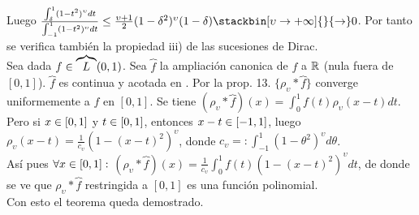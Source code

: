 Luego $\frac{\int_\delta^1 (1-t^2)^\upsilon dt}{\int_{-1}^1 (1-t^2)^\upsilon dt} \leq \frac{\upsilon +1}{2} (1-\delta^2)^\upsilon (1-\delta) \stackbin[\upsilon \to +\infty]{}{\flecha} 0$. Por tanto se verifica también la propiedad iii) de las sucesiones de Dirac. \\
Sea dada $f \in \overbrace{L}(0,1)$. Sea $\overbrace{f}$ la ampliación canonica de $f$ a $\mathbb{R}$ (nula fuera de $[0,1]$). $\overbrace{f}$ es continua y acotada en \R . Por la prop. 13. $\lbrace \rho_\upsilon * \overbrace{f} \rbrace$ converge uniformemente a $f$ en $[0,1]$. Se tiene $(\rho_\upsilon * \overbrace{f} )(x)=\int_0^1 f(t)\rho_\upsilon (x-t)dt$. Pero si $x \in [0,1]$ y $t\in [0,1]$, entonces $x-t \in [-1,1]$, luego $\rho_\upsilon (x-t)=\frac{1}{c_\upsilon}(1-(x-t)^2)^\upsilon$, donde $c_\upsilon =:\int_{-1}^1 (1-\theta^2)^\upsilon d\theta$. \\
Así pues $\forall x \in [0,1]:$ $(\rho_\upsilon * \overbrace{f})(x)=\frac{1}{c_\upsilon}\int_0^1 f(t)(1-(x-t)^2)^\upsilon dt$, de donde se ve que $\rho_\upsilon * \overbrace{f}$ restringida a $[0,1]$ es una función polinomial. \\
Con esto el teorema queda demostrado. 

